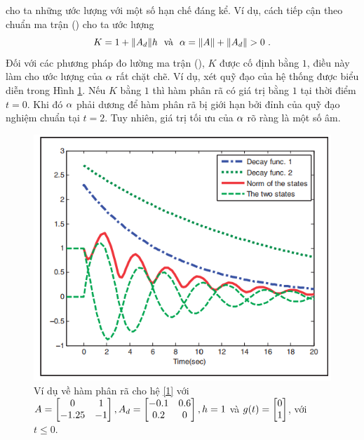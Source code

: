 cho ta những ước lượng với một số hạn chế đáng kể. Ví dụ, cách tiếp cận theo chuẩn ma trận (\cite{Hal93}) cho ta ước lượng
%
\begin{equation}\label{4}
	K = 1 + \Vert A_d \Vert h  \ \mbox{ và } \ \alpha = \Vert A \Vert + \Vert A_d \Vert > 0 \ .
\end{equation}
%
Đối với các phương pháp đo lường ma trận (\cite{Leh94,Ni98}), $K$ được cố định bằng $1$, điều này làm cho ước lượng của $\alpha$ rất chặt chẽ. Ví dụ, xét quỹ đạo của hệ thống được biểu diễn trong Hình \ref{fig:hinh-11}. Nếu $K$ bằng $1$ thì hàm phân rã có giá trị bằng $1$ tại thời điểm $t=0$. Khi đó $\alpha$ phải dương để hàm phân rã bị giới hạn bởi đỉnh của quỹ đạo nghiệm chuẩn tại $t = 2$. Tuy nhiên, giá trị tối ưu của $\alpha$ rõ ràng là một số âm. \\

\begin{figure}[h!]
	\centering
	\includegraphics[scale= 0.7]{"./Hinh/Hinh11"}
	\caption[Ví dụ về hàm phân rã cho hệ có trễ bậc hai $\dot{x}(t) + Ax(t) + A_dx(t-h)= 0$, với $A = \m{0& 1\\ -1.25& -1}, A_d= \m{-0.1&0.6 \\ 0.2&0}, h = 1$ và $g(t)= \m{0\\1}$, với $t \le 0$]{Ví dụ về hàm phân rã cho hệ \eqref{1} với $A = \m{0& 1\\ -1.25& -1}, A_d= \m{-0.1&0.6 \\ 0.2&0}, h = 1$ và $g(t)= \m{0\\1}$, với $t \le 0$.}
	\label{fig:hinh-11}
\end{figure}

